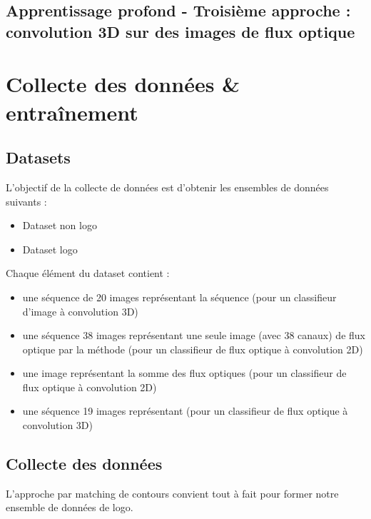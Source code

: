 \documentclass[11pt]{article}
\begin{document}
\subsection{Apprentissage profond - Troisième approche : convolution 3D sur des images de flux optique}
\label{sec:orgf3632a9}

\section{Collecte des données \& entraînement}
\label{sec:orgf8513a4}
\subsection{Datasets}
\label{sec:org6e95d6e}
L'objectif de la collecte de données est d'obtenir les ensembles de données suivants :\\
\begin{itemize}
\item Dataset non logo\\
\item Dataset logo\\
\end{itemize}
Chaque élément du dataset contient :\\
\begin{itemize}
\item une séquence de 20 images représentant la séquence (pour un classifieur d'image à convolution 3D)\\
\item une séquence 38 images représentant une seule image (avec 38 canaux) de flux optique par la méthode \cite{DBLP:journals/corr/SimonyanZ14} (pour un classifieur de flux optique à convolution 2D)\\
\item une image représentant la somme des flux optiques (pour un classifieur de flux optique à convolution 2D)\\
\item une séquence 19 images représentant (pour un classifieur de flux optique à convolution 3D)\\
\end{itemize}

\subsection{Collecte des données}
\label{sec:orgd629266}
L'approche par matching de contours convient tout à fait pour former notre ensemble de données de logo.\\
\end{document}
